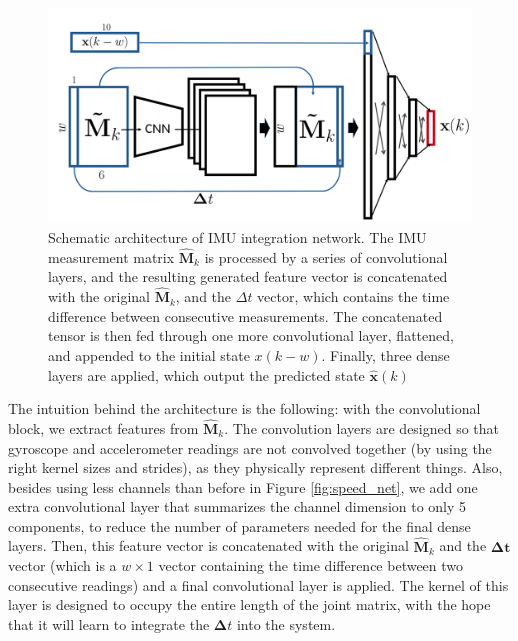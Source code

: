 \begin{figure}
    \centering
    \includegraphics[width=\textwidth,height=\textheight,keepaspectratio]{thesis_template/img/imu_int_net.png} 
    \caption{Schematic architecture of IMU integration network. The IMU measurement matrix $\mathbf{\hat{M}}_k$ is processed by a series of convolutional layers, and the resulting generated feature vector is concatenated with the original $\mathbf{\hat{M}}_k$, and the $\Delta t$ vector, which contains the time difference between consecutive measurements.
    The concatenated tensor is then fed through one more convolutional layer, flattened, and appended to the initial state $x(k-w)$.
    Finally, three dense layers are applied, which output the predicted state $\mathbf{\hat{x}}(k)$}
    \label{fig:state_int_v0}
\end{figure}

The intuition behind the architecture is the following: with the convolutional block, we extract features from $\mathbf{\hat{M}}_k$. 
The convolution layers are designed so that gyroscope and accelerometer readings are not convolved together (by using the right kernel sizes and strides), as they physically represent different things. 
Also, besides using less channels than before in Figure \ref{fig:speed_net}, we add one extra convolutional layer that summarizes the channel dimension to only 5 components, to reduce the number of parameters needed for the final dense layers.
Then, this feature vector is concatenated with the original $\mathbf{\hat{M}}_k$ and the $\boldsymbol{\Delta}\mathbf{t}$ vector (which is a $w\times 1$ vector containing the time difference between two consecutive readings) and a final convolutional layer is applied.
The kernel of this layer is designed to occupy the entire length of the joint matrix, with the hope that it will learn to integrate the $\boldsymbol{\Delta} t$ into the system.

